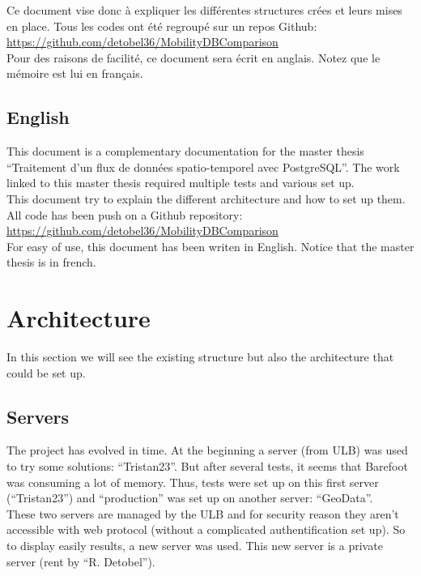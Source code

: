 \documentclass[a4paper,12pt]{article}
\begin{document}
        Ce document vise donc à expliquer les différentes structures crées et leurs mises en place. Tous les codes ont été regroupé sur un repos Github: \url{https://github.com/detobel36/MobilityDBComparison}\\
        Pour des raisons de facilité, ce document sera écrit en anglais. Notez que le mémoire est lui en français.
        
        
    \subsection{English}
        This document is a complementary documentation for the master thesis ``Traitement d'un flux de données spatio-temporel avec PostgreSQL''. The work linked to this master thesis required multiple tests and various set up.\\
        
        This document try to explain the different architecture and how to set up them. All code has been push on a Github repository: \url{https://github.com/detobel36/MobilityDBComparison}\\
        For easy of use, this document has been writen in English. Notice that the master thesis is in french.

        
\section{Architecture}
    In this section we will see the existing structure but also the architecture that could be set up.
    
    \subsection{Servers}
        The project has evolved in time. At the beginning a server (from ULB) was used to try some solutions: ``Tristan23''. But after several tests, it seems that Barefoot was consuming a lot of memory. Thus, tests were set up on this first server (``Tristan23'') and ``production'' was set up on another server: ``GeoData''.\\
        
        These two servers are managed by the ULB and for security reason they aren't accessible with web protocol (without a complicated authentification set up). So to display easily results, a new server was used. This new server is a private server (rent by ``R. Detobel'').\\
        
\end{document}
